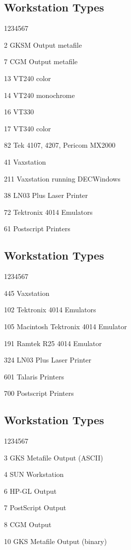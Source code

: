 \subsection{\DECGKS{} Workstation Types}
\begin{DLtt}{1234567}
\item[2]  GKSM Output metafile
\item[7]  CGM Output metafile
\item[13]  VT240 color
\item[14]  VT240 monochrome
\item[16]  VT330
\item[17]  VT340 color
\item[82]  Tek 4107, 4207, Pericom MX2000
\item[41]  Vaxstation
\item[211]  Vaxstation running DECWindows
\item[38]  LN03 Plus Laser Printer
\item[72]  Tektronix 4014 Emulators
\item[61]  Postscript Printers
\end{DLtt}

\subsection{ Workstation Types}
\begin{DLtt}{1234567}
\item[445]  Vaxstation
\item[102]  Tektronix 4014 Emulators
\item[105]  Macintosh Tektronix 4014 Emulator
\item[191]  Ramtek R25 4014 Emulator
\item[324]  LN03 Plus Laser Printer
\item[601]  Talaris Printers
\item[700]  Postscript Printers
\end{DLtt}

\subsection{\SUNGKS{} Workstation Types}
\begin{DLtt}{1234567}
\item[3]  GKS Metafile Output (ASCII)
\item[4]  SUN Workstation
\item[6]  HP-GL Output
\item[7]  PostScript Output
\item[8]  CGM Output
\item[10]  GKS Metafile Output (binary)
\end{DLtt}

